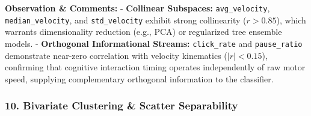 \documentclass[11pt]{article}
\begin{document}
    \textbf{Observation \& Comments:} - \textbf{Collinear Subspaces:}
\texttt{avg\_velocity}, \texttt{median\_velocity}, and
\texttt{std\_velocity} exhibit strong collinearity (\(r > 0.85\)), which
warrants dimensionality reduction (e.g., PCA) or regularized tree
ensemble models. - \textbf{Orthogonal Informational Streams:}
\texttt{click\_rate} and \texttt{pause\_ratio} demonstrate near-zero
correlation with velocity kinematics (\(|r| < 0.15\)), confirming that
cognitive interaction timing operates independently of raw motor speed,
supplying complementary orthogonal information to the classifier.

    \subsubsection{10. Bivariate Clustering \& Scatter
Separability}\label{bivariate-clustering-scatter-separability}
\end{document}
